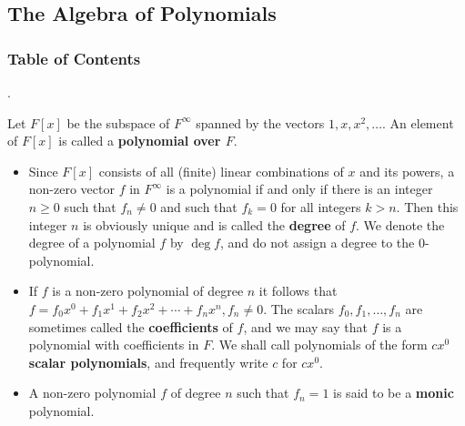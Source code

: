 \documentclass[8pt]{beamer}
\newcommand{\tb}[1]{\textbf{#1}}
\begin{document}
\subsection{The Algebra of Polynomials}

\begingroup
    \begin{frame}
        \frametitle{Table of Contents}
        \tableofcontents[currentsubsection]
    \end{frame}
\endgroup


\begin{frame}{.}
    \begin{definition}
        Let $F[x]$ be the subspace of $F^\infty$ spanned by the vectors $1, x, x^2, \dots$.
        An element of $F[x]$ is called a \tb{polynomial over $F$}.
    \end{definition}

    \begin{itemize}
        \item Since $F[x]$ consists of all (finite) linear combinations of $x$ and its powers, a non-zero vector $f$ in $F^\infty$ is a polynomial if and only if there is an integer $n \geq 0$ such that $f_n \neq 0$ and such that $f_k =0$ for all integers $k>n$.
        Then this integer $n$ is obviously unique and is called the \tb{degree} of $f$.
        We denote the degree of a  polynomial $f$ by $\deg f$, and do not assign a degree to the $0$-polynomial.
        \item If $f$ is a non-zero polynomial of degree $n$ it follows that $f = f_0 x^0 + f_1 x^1 + f_2 x^2 + \cdots + f_n x^n, f_n \neq 0$.
        The scalars $f_0, f_1, \dots, f_n$ are sometimes called the \tb{coefficients} of $f$, and we may say that $f$ is a polynomial with coefficients in $F$.
        We shall call polynomials of the form $cx^0$ \tb{scalar polynomials}, and frequently write $c$ for $cx^0$.
        \item A non-zero polynomial $f$ of degree $n$ such that $f_n=1$ is said to be a \tb{monic} polynomial.
    \end{itemize}
\end{frame}
\end{document}
